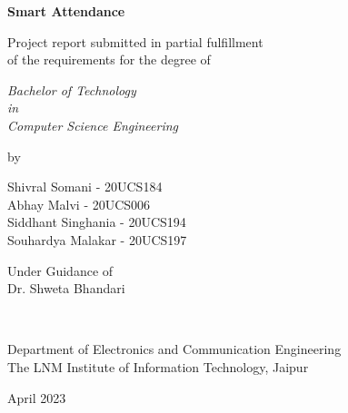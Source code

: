 \thispagestyle{empty}
\begin{center}
{\Large \bf Smart Attendance }


\vspace*{1.75cm}
{\large Project report submitted in partial fulfillment\\}
{\large  of the requirements for the degree of \\}

\vspace*{1cm}
{\it {\large Bachelor of Technology} \\
{\large in\\}
{\large Computer Science Engineering \\}}

\vspace*{1cm}
{\large by}

\vspace*{1cm}
{\large Shivral Somani - 20UCS184\\}
{\large Abhay Malvi - 20UCS006 \\}
{\large Siddhant Singhania - 20UCS194 \\}
{\large Souhardya Malakar - 20UCS197 \\}


\vspace*{5mm}
{\large Under Guidance of \\}
{\large Dr. Shweta Bhandari  \\}

\vspace*{1.0cm}
{\\}

\vspace*{2.0cm}
{\large Department of Electronics and Communication Engineering \\}
{\large The LNM Institute of Information Technology, Jaipur\\}

\vspace*{1.0cm}
{\large April 2023\\}
\end{center}

\clearpage
